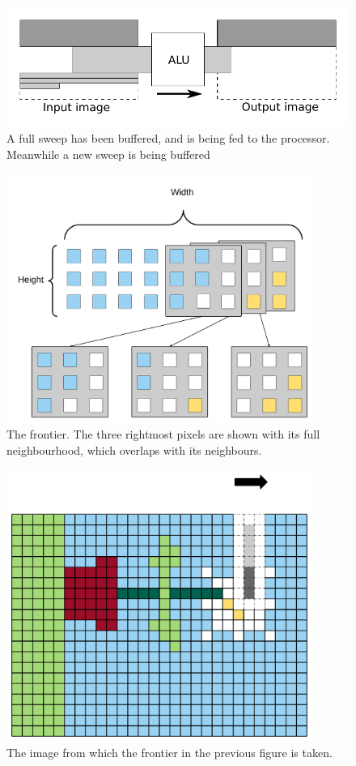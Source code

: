 \begin{figure}[h!]
    \includegraphics[width=\linewidth]{img/daisy_processing.pdf}
    \caption{A full sweep has been buffered, and is being fed to the processor. Meanwhile a new sweep is being buffered}
    \label{fig:sweep_feed}
\end{figure}

\begin{figure}[h!]
    \centering
    \includegraphics[width=10cm]{img/frontier1.png}
    \caption{The frontier. The three rightmost pixels are shown with its full neighbourhood, which overlaps with its neighbours.}
    \label{fig:frontier1}
\end{figure}

\begin{figure}[h!]
    \centering
    \includegraphics[width=10cm]{img/frontier2.png}
    \caption{The image from which the frontier in the previous figure is taken.}
    \label{fig:frontier2}
\end{figure}

